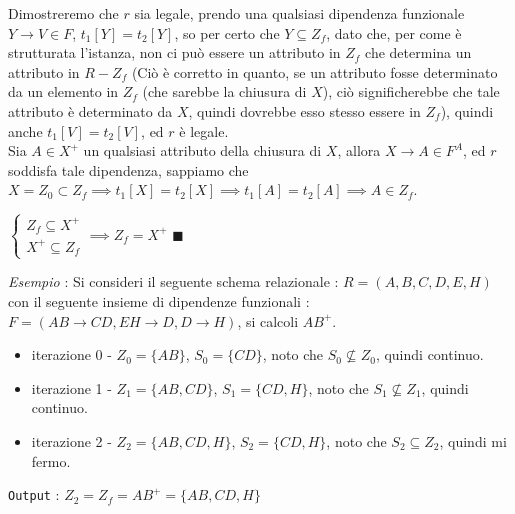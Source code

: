 \documentclass[12pt, letterpaper]{article}
\newcommand{\code}[1]{\colorbox{light-gray}{\texttt{#1}}}
\begin{document}
Dimostreremo che \(r\) sia legale, prendo una qualsiasi dipendenza funzionale \(Y\rightarrow V\in F\), 
\(t_1[Y]=t_2[Y]\), so per certo che \(Y\subseteq Z_f\), dato che, per come è strutturata l'istanza, non ci può 
essere un attributo in \(Z_f\) che determina un attributo in \(R-Z_f\) (Ciò è corretto in quanto, se un attributo fosse determinato 
da un elemento in \(Z_f\) (che sarebbe la chiusura di \(X\)), ciò significherebbe che tale attributo è determinato da \(X\), quindi 
dovrebbe esso stesso essere in \(Z_f\)), quindi anche \(t_1[V]=t_2[V]\), ed \(r\) è legale.\\ 
Sia \(A\in X^+\) un qualsiasi attributo della chiusura di \(X\), allora \(X\rightarrow A\in F^A\), ed \(r\) soddisfa tale 
dipendenza, sappiamo che \(X=Z_0\subset Z_f\implies t_1[X]=t_2[X]\implies t_1[A]=t_2[A]\implies A\in Z_f\). \begin{center}
    \(
    \begin{cases}
        Z_f\subseteq X^+\\X^+\subseteq Z_f
    \end{cases} \implies  Z_f= X^+  
    \) \hphantom{text}\(\blacksquare\)
\end{center}
\textit{Esempio} : Si consideri il seguente schema relazionale : \(R=(A,B,C,D,E,H)\) con il seguente insieme 
di dipendenze funzionali : \(F=(AB\rightarrow CD,EH\rightarrow D,D \rightarrow H)\), si calcoli \(AB^+\).\begin{itemize}
    \item iterazione 0 - \(Z_0=\{AB\}\), \(S_0=\{CD\}\), noto che \(S_0\nsubseteq Z_0\), quindi continuo.
    \item iterazione 1 - \(Z_1=\{AB,CD\}\), \(S_1=\{CD,H\}\), noto che \(S_1\nsubseteq Z_1\), quindi continuo.
    \item iterazione 2 - \(Z_2=\{AB,CD,H\}\), \(S_2=\{CD,H\}\), noto che \(S_2 \subseteq Z_2\), quindi mi fermo.\\
\end{itemize}
\code{Output} : \(Z_2=Z_f=AB^+=\{AB,CD,H\}\)
\end{document}
